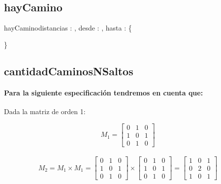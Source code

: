 \documentclass[10pt,a4paper]{article}
\begin{document}
\subsection{hayCamino}


\begin{proc}{hayCamino}{\In distancias : \TLista{\TLista{\ent}}, \In desde : \ent, \In hasta : \ent}{\bool \{ } 
	
\end{proc}


\}


\subsection{cantidadCaminosNSaltos}
\paragraph{Para la siguiente especificación tendremos en cuenta que:}{Dada la matriz de orden 1:}

\[
M_{1} = \begin{bmatrix} 0 & 1 & 0 \\	1 & 0 & 1 \\	0 & 1 & 0 \end{bmatrix} \]
\\
\[
M_{2} = M_{1} \times M_{1} =
\begin{bmatrix}	0 & 1 & 0 \\	1 & 0 & 1 \\	0 & 1 & 0\end{bmatrix}
\times
\begin{bmatrix}	0 & 1 & 0 \\	1 & 0 & 1 \\	0 & 1 & 0\end{bmatrix}
=
\begin{bmatrix}	1 & 0 & 1 \\	0 & 2 & 0 \\	1 & 0 & 1\end{bmatrix}
\]
\end{document}
